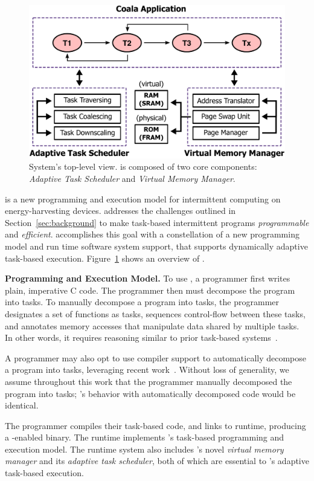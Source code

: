 \begin{figure}
	\centering
	\includegraphics[width=0.45\columnwidth]{figures/overview.pdf}
	\caption{System's top-level view. \sys is composed of two core components: \emph{Adaptive Task Scheduler} and \emph{Virtual Memory Manager}.}
	\label{fig:system_overview}
\end{figure}

\sys is a new programming and execution model for intermittent computing on energy-harvesting devices. \sys addresses the challenges outlined in Section~\ref{sec:background} to make task-based intermittent programs {\em programmable} and {\em efficient}. \sys accomplishes this goal with a constellation of a new programming model and run time software system support, that supports dynamically adaptive task-based execution. Figure~\ref{fig:system_overview} shows an overview of \sys.

\textbf{Programming and Execution Model.}  To use \sys, a programmer first writes plain, imperative C code. The programmer then must decompose the program into tasks. To manually decompose a program into tasks, the programmer designates a set of functions as tasks, sequences control-flow between these tasks, and annotates memory accesses that manipulate data shared by multiple tasks. In other words, it requires reasoning similar to prior task-based systems~\cite{chain,alpaca}. 

A programmer may also opt to use compiler support to automatically decompose a program into tasks, leveraging recent work~\cite{cleancut_2018,baghsorkhi_cgo_2018}. Without loss of generality, we assume throughout this work that the programmer manually decomposed the program into tasks; \sys's behavior with automatically decomposed code would be identical.

The programmer compiles their task-based code, and links to \sys runtime,
producing a \sys-enabled binary. The runtime implements \sys's task-based
programming and execution model. The runtime system also includes \sys's novel
{\em virtual memory manager} and its {\em adaptive task scheduler}, both
of which are essential to \sys's adaptive task-based execution.

